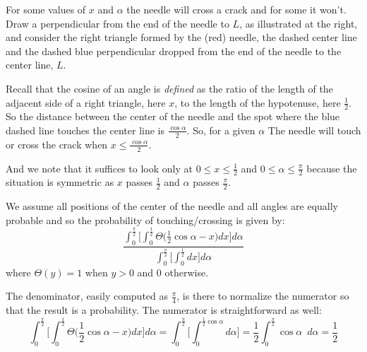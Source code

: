 \documentclass[11pt]{tufte-handout}
\begin{document}
For some values of $x$ and $\alpha$ the needle will cross a crack and for some it won't.  Draw a perpendicular from the end of the needle to $L$, as illustrated at the right, and consider the right triangle formed by the (red) needle, the dashed center line and the dashed blue perpendicular dropped from the end of the needle to the center line, $L$.
\begin{marginfigure}
\end{marginfigure}


Recall that the cosine of an angle is {\it defined}  as the ratio of the length of the adjacent side of a right triangle, here $x$, to the length of the hypotenuse, here $\frac{1}{2}$. So the distance between the center of the needle and the spot where the blue dashed line touches the center line is $\frac{\cos \alpha}{2}$. So, for a given $\alpha$ The needle will touch or cross the crack when $x \leq \frac{\cos\alpha}{2}$. 

And we note that it suffices to look only at $0 \leq x \leq \frac{1}{2}$ and $0 \leq \alpha \leq \frac{\pi}{2}$ because the situation is symmetric as $x$ passes $\frac{1}{2}$ and $\alpha$ passes $\frac{\pi}{2}$. 

We assume all positions of the center of the needle and all angles are equally probable and so the probability of touching/crossing is given by:
\[
\frac
{\int_0^\frac{\pi}{2}\bigg[\int_0^\frac{1}{2}
\Theta\big(\frac{1}{2}\cos\alpha - x\big) dx\bigg] d\alpha}
{\int_0^\frac{\pi}{2}\big[\int_0^\frac{1}{2} dx\big] d\alpha}
\]
where $\Theta(y) = 1$ when $y>0$ and $0$ otherwise.

The denominator, easily computed as $\frac{\pi}{4}$, is there to normalize the numerator so that the result is a probability.  The numerator is straightforward as well:
\[
\int_0^\frac{\pi}{2}\bigg[\int_0^\frac{1}{2}
\Theta\big(\frac{1}{2}\cos\alpha - x\big) dx\bigg] d\alpha
=
\int_0^\frac{\pi}{2}\bigg[\int_0^{\frac{1}{2}\cos\alpha}d\alpha\bigg]
=
\frac{1}{2}\int_0^\frac{\pi}{2}\cos\alpha \enspace d\alpha
=\frac{1}{2}
\]
\end{document}

